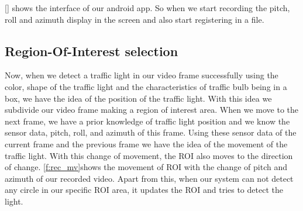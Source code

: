 \ref{} shows the interface of our android app.
So when we start recording the pitch, roll and azimuth display in the screen and also start registering in a file.

\subsection{Region-Of-Interest selection}
\label{s:roi}
Now, when we detect a traffic light in our video frame successfully using the color, shape of the traffic light and the characteristics of traffic bulb being in a box, we have the idea of the position of the traffic light.
With this idea we subdivide our video frame making a region of interest area.
When we move to the next frame, we have a prior knowledge of traffic light position and we know the sensor data, pitch, roll, and azimuth of this frame.
Using these sensor data of the current frame and the previous frame we have the idea of the movement of the traffic light.
With this change of movement, the ROI also moves to the direction of change.
\ref{f:rec_mv}shows the movement of ROI with the change of pitch and azimuth of our recorded video.
Apart from this, when our system can not detect any circle in our specific ROI area, it updates the ROI and tries to detect the light.


